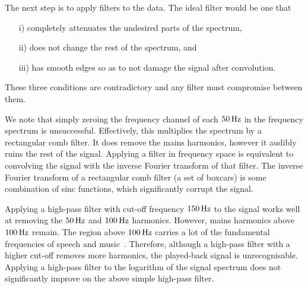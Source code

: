\documentclass[paper-main.tex]{subfiles}
\begin{document}
The next step is to apply filters to the data. 
The ideal filter would be one that 
\begin{itemize}
\item[i)] completely attenuates the undesired parts of the spectrum, 
\item[ii)] does not change the rest of the spectrum, and 
\item[iii)] has smooth edges so as to not damage the signal after convolution. 
\end{itemize}
These three conditions are contradictory and any filter must compromise between them. 

We note that simply zeroing the frequency channel of each $50\,{\rm Hz}$ in the frequency spectrum is unsuccessful. 
Effectively, this multiplies the spectrum by a rectangular comb filter. 
It does remove the mains harmonics, however it audibly ruins the rest of the signal. 
Applying a filter in frequency space is equivalent to convolving the signal with the inverse Fourier transform of that filter. 
The inverse Fourier transform of a rectangular comb filter (a set of boxcars) is some combination of sinc functions, which significantly corrupt the signal. 


Applying a high-pass filter with cut-off frequency $150\,{\rm Hz}$ to the signal works well at removing the $50\,{\rm Hz}$ and $100\,{\rm Hz}$ harmonics.
However, mains harmonics above $100\,{\rm Hz}$ remain. 
The region above $100\,{\rm Hz}$ carries a lot of the fundamental frequencies of speech and music~\cite{speech_intelligibility}. 
Therefore, although a high-pass filter with a higher cut-off removes more harmonics, the played-back signal is unrecognisable. 
Applying a high-pass filter to the logarithm of the signal spectrum does not significantly improve on the above simple high-pass filter.

\end{document}
